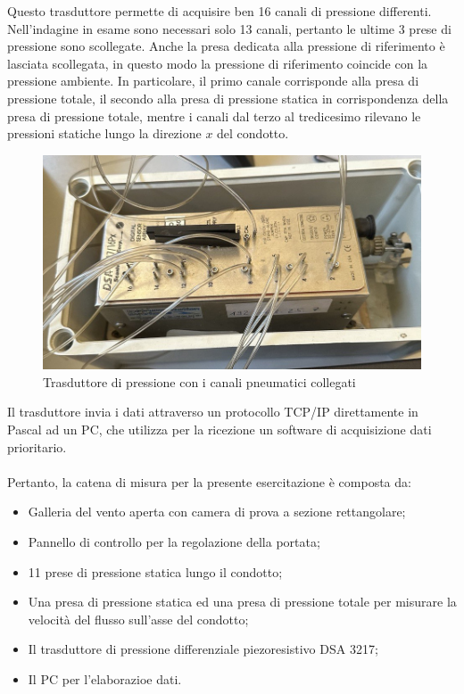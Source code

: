 \noindent Questo trasduttore permette di acquisire ben 16 canali di pressione differenti. Nell'indagine in esame sono necessari solo 13 canali, pertanto le ultime 3 prese di pressione sono scollegate. Anche la presa dedicata alla pressione di riferimento è lasciata scollegata, in questo modo la pressione di riferimento coincide con la pressione ambiente.
\newpage
\noindent In particolare, il primo canale corrisponde alla presa di pressione totale, il secondo alla presa di pressione statica in corrispondenza della presa di pressione totale, mentre i canali dal terzo al tredicesimo rilevano le pressioni statiche lungo la direzione $x$ del condotto.
\begin{figure}[H]
    \centering
    \includegraphics[width=.75\textwidth]{images/7/trasd.jpg}
    \caption{Trasduttore di pressione con i canali pneumatici collegati}
\end{figure}

\noindent Il trasduttore invia i dati attraverso un protocollo TCP/IP direttamente in Pascal ad un PC, che utilizza per la ricezione un software di acquisizione dati prioritario.\\\\
Pertanto, la catena di misura per la presente esercitazione è composta da:
\begin{itemize}
    \item Galleria del vento aperta con camera di prova a sezione rettangolare;
    \item Pannello di controllo per la regolazione della portata;
    \item 11 prese di pressione statica lungo il condotto;
    \item Una presa di pressione statica ed una presa di pressione totale per misurare la velocità del flusso sull'asse del condotto;
    \item Il trasduttore di pressione differenziale piezoresistivo DSA 3217;
    \item Il PC per l'elaborazioe dati.
\end{itemize}

